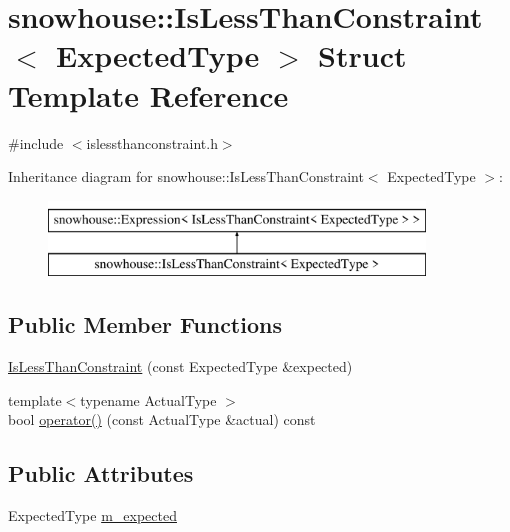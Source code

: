\hypertarget{structsnowhouse_1_1IsLessThanConstraint}{}\section{snowhouse\+::Is\+Less\+Than\+Constraint$<$ Expected\+Type $>$ Struct Template Reference}
\label{structsnowhouse_1_1IsLessThanConstraint}


{\ttfamily \#include $<$islessthanconstraint.\+h$>$}

Inheritance diagram for snowhouse\+::Is\+Less\+Than\+Constraint$<$ Expected\+Type $>$\+:\begin{figure}[H]
\begin{center}
\leavevmode
\includegraphics[height=2.000000cm]{structsnowhouse_1_1IsLessThanConstraint}
\end{center}
\end{figure}
\subsection*{Public Member Functions}
\begin{DoxyCompactItemize}
\item 
\mbox{\hyperlink{structsnowhouse_1_1IsLessThanConstraint_ac84e0ef9f32ccfc57f29e3d99ad1df20}{Is\+Less\+Than\+Constraint}} (const Expected\+Type \&expected)
\item 
{\footnotesize template$<$typename Actual\+Type $>$ }\\bool \mbox{\hyperlink{structsnowhouse_1_1IsLessThanConstraint_a7de3d3ec1601c58e8f153acce340b192}{operator()}} (const Actual\+Type \&actual) const
\end{DoxyCompactItemize}
\subsection*{Public Attributes}
\begin{DoxyCompactItemize}
\item 
Expected\+Type \mbox{\hyperlink{structsnowhouse_1_1IsLessThanConstraint_a76819282b260cb03bef8ce82f1fc675e}{m\+\_\+expected}}
\end{DoxyCompactItemize}


